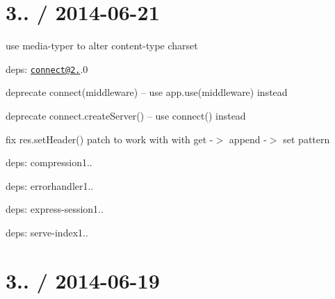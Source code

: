 {\ttfamily \section*{3.. / 2014-\/06-\/21 }}

{\ttfamily }

{\ttfamily 
\begin{DoxyItemize}
\item use {\ttfamily media-\/typer} to alter content-\/type charset
\item deps\+: \href{mailto:connect@2.21}{\tt connect@2.}.0
\begin{DoxyItemize}
\item deprecate {\ttfamily connect(middleware)} -- use {\ttfamily app.\+use(middleware)} instead
\item deprecate {\ttfamily connect.\+create\+Server()} -- use {\ttfamily connect()} instead
\item fix {\ttfamily res.\+set\+Header()} patch to work with with get -\/$>$ append -\/$>$ set pattern
\item deps\+: compression1..
\item deps\+: errorhandler1..
\item deps\+: express-\/session1..
\item deps\+: serve-\/index1..
\end{DoxyItemize}
\end{DoxyItemize}}

{\ttfamily \section*{3.. / 2014-\/06-\/19 }}

{\ttfamily }

